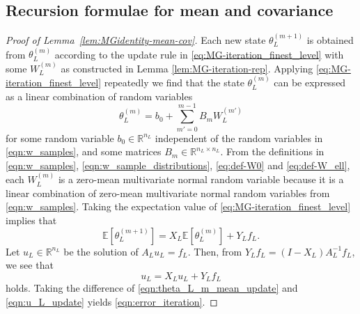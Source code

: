 \documentclass[11pt,english]{article}
\theoremstyle{plain}
\theoremstyle{plain}
\theoremstyle{plain}
\theoremstyle{plain}
\numberwithin{equation}{section}
\newcommand*{\id}{I}
\begin{document}
\subsection{Recursion formulae for mean and covariance}\label{sec:proof_recursion}
\begin{proof}[Proof of Lemma~\ref{lem:MGidentity-mean-cov}]
	Each new state $\theta_L^{(m+1)}$
	is obtained from $\theta_L^{(m)}$ according to the update rule in \eqref{eq:MG-iteration_finest_level} with some $W_L^{(m)}$ as constructed in Lemma \ref{lem:MG-iteration-rep}.
	Applying \eqref{eq:MG-iteration_finest_level} repeatedly we find that the state $\theta_L^{(m)}$ can be expressed as a linear combination of random variables
	\begin{equation}\label{eq:theta-itr-simple}
		\theta_L^{(m)} = b_0 + \sum_{m'=0}^{m-1} B_m W_L^{(m')}
	\end{equation}
	for some random variable $b_0\in\mathbb{R}^{n_L}$ independent of the random variables in \eqref{eqn:w_samples}, and some matrices $B_m\in\mathbb{R}^{n_L\times n_L}$.
	From the definitions in \eqref{eqn:w_samples}, \eqref{eqn:w_sample_distributions}, \eqref{eq:def-W0} and \eqref{eq:def-W_ell},
	each $W_L^{(m)}$ is a zero-mean multivariate normal random variable because it is a linear combination of zero-mean multivariate normal random variables from \eqref{eqn:w_samples}.
	Taking the expectation value of \eqref{eq:MG-iteration_finest_level} implies that
	\begin{equation}
		\mathbb{E}[\theta_{L}^{(m+1)}]=X_{L}\mathbb{E}[\theta_{L}^{(m)}]+Y_{L}f_{L}.
		\label{eqn:theta_L_m_mean_update}
	\end{equation}
	Let $u_{L}\in\mathbb{R}^{n_{L}}$ be the solution of $A_{L}u_{L}=f_{L}.$
	Then, from $Y_Lf_{L}=(\id -X_L)A_L^{-1}f_{L}$, we see that
	\begin{equation}
		u_{L}=X_{L}u_{L}+Y_{L}f_{L}\label{eqn:u_L_update}
	\end{equation}
	holds. Taking the difference of \eqref{eqn:theta_L_m_mean_update} and \eqref{eqn:u_L_update} yields \eqref{eqn:error_iteration}.


\end{proof}
\end{document}
